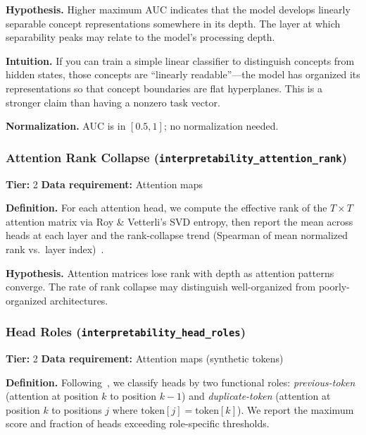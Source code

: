 \documentclass{article}
\begin{document}
\textbf{Hypothesis.}
Higher maximum AUC indicates that the model develops linearly separable concept representations somewhere in its depth. The layer at which separability peaks may relate to the model's processing depth.

\textbf{Intuition.}
If you can train a simple linear classifier to distinguish concepts from hidden states, those concepts are ``linearly readable''---the model has organized its representations so that concept boundaries are flat hyperplanes. This is a stronger claim than having a nonzero task vector.

\textbf{Normalization.} AUC is in $[0.5, 1]$; no normalization needed.

\subsubsection{Attention Rank Collapse (\texttt{interpretability\_attention\_rank})}
\label{app:attn-rank}

\textbf{Tier:} 2 \quad \textbf{Data requirement:} Attention maps

\textbf{Definition.} For each attention head, we compute the effective rank of the $T \times T$ attention matrix via Roy \& Vetterli's SVD entropy, then report the mean across heads at each layer and the rank-collapse trend (Spearman of mean normalized rank vs.\ layer index)~\citep{dong2021attention}.

\textbf{Hypothesis.} Attention matrices lose rank with depth as attention patterns converge. The rate of rank collapse may distinguish well-organized from poorly-organized architectures.

\subsubsection{Head Roles (\texttt{interpretability\_head\_roles})}
\label{app:head-roles}

\textbf{Tier:} 2 \quad \textbf{Data requirement:} Attention maps (synthetic tokens)

\textbf{Definition.} Following~\citet{olsson2022context}, we classify heads by two functional roles: \emph{previous-token} (attention at position $k$ to position $k-1$) and \emph{duplicate-token} (attention at position $k$ to positions $j$ where $\text{token}[j] = \text{token}[k]$). We report the maximum score and fraction of heads exceeding role-specific thresholds.
\end{document}
